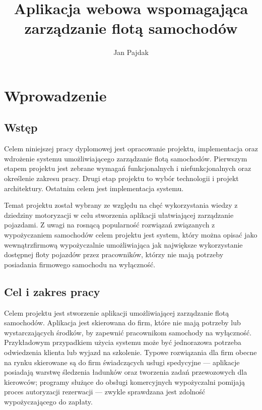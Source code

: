 \documentclass[eng,printmode,openany]{mgr}
\title{Aplikacja webowa wspomagająca zarządzanie flotą samochodów}
\author{Jan Pajdak}
\begin{document}
	
	\renewcommand{\bibname}{Literatura} 
	\appendixpageoff
	\maketitle
	
	\tableofcontents 
	
	\newpage
	\listoffigures
	
	\newpage
	\listoftables
	
	\newpage
	\lstlistoflistings
	
	
	\newpage
	\chapter{Wprowadzenie}
	\section{Wstęp}
	Celem niniejszej pracy dyplomowej jest opracowanie projektu, implementacja oraz wdrożenie systemu umożliwiającego zarządzanie flotą samochodów. Pierwszym etapem projektu jest zebrane wymagań funkcjonalnych i niefunkcjonalnych oraz określenie zakresu pracy. Drugi etap projektu to wybór technologii i projekt architektury. Ostatnim celem jest implementacja systemu.
	
	Temat projektu został wybrany ze względu na chęć wykorzystania wiedzy z dziedziny motoryzacji w celu stworzenia aplikacji ułatwiającej zarządzanie pojazdami. Z uwagi na rosnącą popularność rozwiązań związanych z wypożyczaniem samochodów celem projektu jest system, który można opisać jako wewnątrzfirmową wypożyczalnie umożliwiająca jak największe wykorzystanie dostępnej floty pojazdów przez pracowników, którzy nie mają potrzeby posiadania firmowego samochodu na wyłączność.
	
	\section{Cel i zakres pracy}
	Celem projektu jest stworzenie aplikacji umożliwiającej zarządzanie flotą samochodów. Aplikacja jest skierowana do firm, które nie mają potrzeby lub wystarczających środków, by zapewnić pracownikom samochody na wyłączność. Przykładowym przypadkiem użycia systemu może być jednorazowa potrzeba odwiedzenia klienta lub wyjazd na szkolenie. Typowe rozwiązania dla firm obecne na rynku skierowane są do firm świadczących usługi spedycyjne — aplikacje posiadają warstwę śledzenia ładunków oraz tworzenia zadań przewozowych dla kierowców; programy służące do obsługi komercyjnych wypożyczalni pomijają proces autoryzacji rezerwacji — zwykle sprawdzana jest zdolność wypożyczającego do zapłaty.
	
\end{document}
